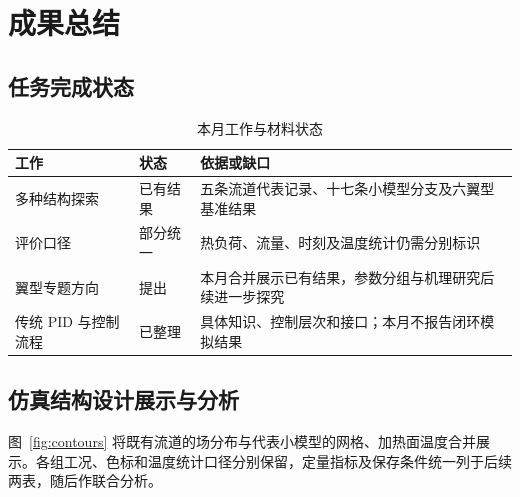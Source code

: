 \documentclass[stage2,fontset=fandol]{ydzjreport}
\begin{document}

\section{成果总结}

\subsection{任务完成状态}

\begin{table}[H]\centering
\caption{本月工作与材料状态}\label{tab:tasks}
\begin{tabularx}{\textwidth}{@{}Y Y Y@{}}
\toprule
{} 工作 & 状态 & 依据或缺口 \\
\midrule
多种结构探索 & 已有结果 & 五条流道代表记录、十七条小模型分支及六翼型基准结果 \\
评价口径 & 部分统一 & 热负荷、流量、时刻及温度统计仍需分别标识 \\
翼型专题方向 & 提出 & 本月合并展示已有结果，参数分组与机理研究后续进一步探究 \\
传统 PID 与控制流程 & 已整理 & 具体知识、控制层次和接口；本月不报告闭环模拟结果 \\
\bottomrule\end{tabularx}\end{table}

\subsection{仿真结构设计展示与分析}

图~\ref{fig:contours} 将既有流道的场分布与代表小模型的网格、加热面温度合并展示。各组工况、色标和温度统计口径分别保留，定量指标及保存条件统一列于后续两表，随后作联合分析。
\end{document}
